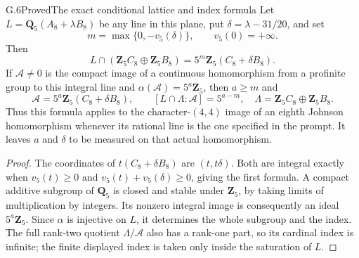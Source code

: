 \begin{statement}{G.6}{Proved}{The exact conditional lattice and index formula}
Let $L=\mathbf Q_5(A_8+\lambda B_8)$ be any line in this plane,
put $\delta=\lambda-31/20$, and set
\[
 m=\max\{0,-v_5(\delta)\},\qquad v_5(0)=+\infty.
\]
Then
\[
 L\cap(\mathbf Z_5C_8\oplus\mathbf Z_5B_8)
     =5^m\mathbf Z_5(C_8+\delta B_8).
\]
If $\mathcal A\ne0$ is the compact image of a continuous
homomorphism from a profinite group to this integral line and
$\alpha(\mathcal A)=5^a\mathbf Z_5$, then $a\geq m$ and
\[
 \mathcal A=5^a\mathbf Z_5(C_8+\delta B_8),\qquad
 [L\cap\Lambda:\mathcal A]=5^{a-m},
 \quad\Lambda=\mathbf Z_5C_8\oplus\mathbf Z_5B_8.
\]
Thus this formula applies to the character-$(4,4)$ image of an
eighth Johnson homomorphism whenever its rational line is the
one specified in the prompt. It leaves $a$ and $\delta$ to be
measured on that actual homomorphism.
\end{statement}
\begin{proof}
The coordinates of $t(C_8+\delta B_8)$ are $(t,t\delta)$.
Both are integral exactly when $v_5(t)\geq0$ and
$v_5(t)+v_5(\delta)\geq0$, giving the first formula.
A compact additive subgroup of $\mathbf Q_5$ is closed and stable
under $\mathbf Z_5$, by taking limits of multiplication by integers.
Its nonzero integral image is consequently an ideal
$5^a\mathbf Z_5$. Since $\alpha$ is injective on $L$, it determines
the whole subgroup and the index. The full rank-two quotient
$\Lambda/\mathcal A$ also has a rank-one part, so its cardinal
index is infinite; the finite displayed index is taken only inside
the saturation of $L$.
\end{proof}

